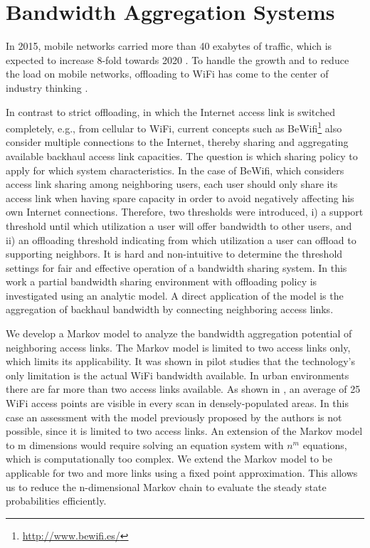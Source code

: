 \chapter{Bandwidth Aggregation Systems}\label{chap:aggregation}

In 2015, mobile networks carried more than 40 exabytes of traffic, which is expected to increase 8-fold towards 2020 \cite{cisco2016mobile}.
To handle the growth and to reduce the load on mobile networks, offloading to WiFi has come to the center of industry thinking \cite{wba2011wifi}.

In contrast to strict offloading, in which the Internet access link is switched completely, e.g., from cellular to WiFi, current concepts such as BeWifi\footnote{\url{http://www.bewifi.es/}} also consider multiple connections to the Internet, thereby sharing and aggregating available backhaul access link capacities. The question is which sharing policy to apply for which system characteristics. In the case of BeWifi, which considers access link sharing among neighboring users, each user should only share its access link when having spare capacity in order to avoid negatively affecting his own Internet connections. Therefore, two thresholds were introduced, i) a support threshold until which utilization a user will offer bandwidth to other users, and ii) an offloading threshold indicating from which utilization a user can offload to supporting neighbors.
It is hard and non-intuitive to determine the threshold settings for fair and effective operation of a bandwidth sharing system.
In this work a partial bandwidth sharing environment with offloading policy is investigated using an analytic model.
A direct application of the model is the aggregation of backhaul bandwidth by connecting neighboring access links.

We develop a Markov model to analyze the bandwidth aggregation potential of neighboring access links.
The Markov model is limited to two access links only, which limits its applicability.
It was shown in pilot studies that the technology's only limitation is the actual WiFi bandwidth available.
In urban environments there are far more than two access links available.
As shown in \cite{sapiezynski2015tracking}, an average of 25 WiFi access points are visible in every scan in densely-populated areas.
In this case an assessment with the model previously proposed by the authors is not possible, since it is limited to two access links.
An extension of the Markov model to m dimensions would require solving an equation system with $n^m$ equations, which is computationally too complex.
We extend the Markov model to be applicable for two and more links using a fixed point approximation.
This allows us to reduce the n-dimensional Markov chain to evaluate the steady state probabilities efficiently.

